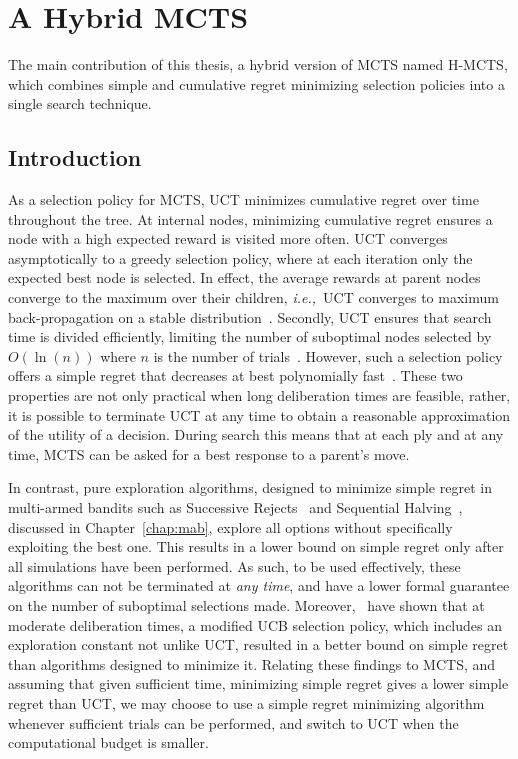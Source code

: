 \documentclass{kecsmstr}
\newcommand{\ie}{{\it i.e.,}~}
\begin{document}
\chapter{A Hybrid MCTS}
\label{chap:hybmcts}
\begin{chaptercontents}
The main contribution of this thesis, a hybrid version of MCTS named H-MCTS, which combines simple and cumulative regret minimizing selection policies into a single search technique.
\end{chaptercontents}
\section{Introduction}
As a selection policy for MCTS, UCT minimizes cumulative regret over time throughout the tree. At internal nodes, minimizing cumulative regret ensures a node with a high expected reward is visited more often. UCT converges asymptotically to a greedy selection policy, where at each iteration only the expected best node is selected. In effect, the average rewards at parent nodes converge to the maximum over their children, \ie UCT converges to maximum back-propagation on a stable distribution~. Secondly, UCT ensures that search time is divided efficiently, limiting the number of  suboptimal nodes selected by $O(\ln(n))$ where $n$ is the number of trials~. However, such a selection policy offers a simple regret that decreases at best polynomially fast~. These two properties are not only practical when long deliberation times are feasible, rather, it is possible to terminate UCT at any time to obtain a reasonable approximation of the utility of a decision. During search this means that at each ply and at any time, MCTS can be asked for a best response to a parent's move.

In contrast, pure exploration algorithms, designed to minimize simple regret in multi-armed bandits such as Successive Rejects~ and Sequential Halving~, discussed in Chapter~\ref{chap:mab}, explore all options without specifically exploiting the best one. This results in a lower bound on simple regret only after all simulations have been performed. As such, to be used effectively, these algorithms can not be terminated at \emph{any time}, and have a lower formal guarantee on the number of suboptimal selections made. Moreover,~ have shown that at moderate deliberation times, a modified UCB selection policy, which includes an exploration constant not unlike UCT, resulted in a better bound on simple regret than algorithms designed to minimize it. Relating these findings to MCTS, and assuming that given sufficient time, minimizing simple regret gives a lower simple regret than UCT, we may choose to use a simple regret minimizing algorithm whenever sufficient trials can be performed, and switch to UCT when the computational budget is smaller.
\end{document}
